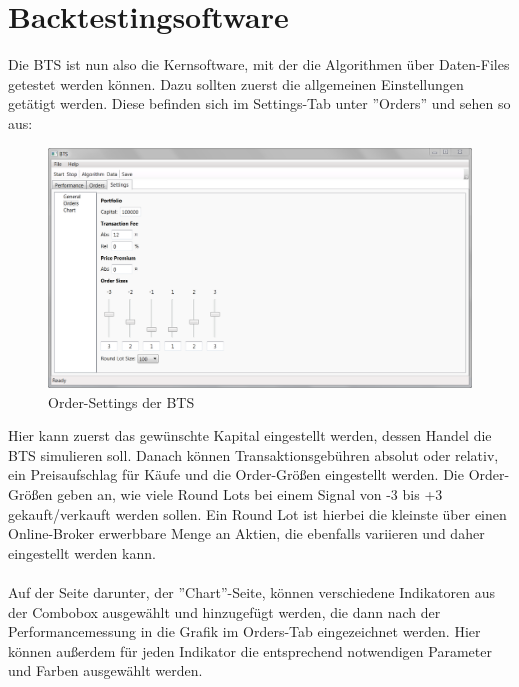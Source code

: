 \section{Backtestingsoftware}

Die \gls{BTS} ist nun also die Kernsoftware, mit der die Algorithmen über Daten-Files getestet werden können. Dazu sollten zuerst die allgemeinen Einstellungen getätigt werden. Diese befinden sich im Settings-Tab unter ''Orders'' und sehen so aus:

\begin{figure}[H]
\centering
\includegraphics[width=1\textwidth]{images/btsordersettings.png}
\caption{Order-Settings der \gls{BTS}}
\end{figure}

Hier kann zuerst das gewünschte Kapital eingestellt werden, dessen Handel die \gls{BTS} simulieren soll. Danach können Transaktionsgebühren absolut oder relativ, ein Preisaufschlag für Käufe und die Order-Größen eingestellt werden. Die Order-Größen geben an, wie viele Round Lots bei einem Signal von -3 bis +3 gekauft/verkauft werden sollen. Ein Round Lot ist hierbei die kleinste über einen Online-Broker erwerbbare Menge an Aktien, die ebenfalls variieren und daher eingestellt werden kann.\\ \\

Auf der Seite darunter, der ''Chart''-Seite, können verschiedene Indikatoren aus der Combobox ausgewählt und hinzugefügt werden, die dann nach der Performancemessung in die Grafik im Orders-Tab eingezeichnet werden. Hier können außerdem für jeden Indikator die entsprechend notwendigen Parameter und Farben ausgewählt werden.


